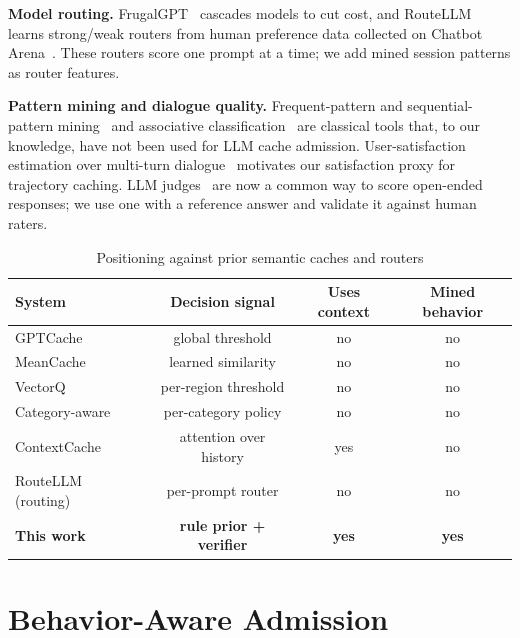 \documentclass[conference]{IEEEtran}
\begin{document}
\textbf{Model routing.} FrugalGPT~\cite{chen2024frugalgpt} cascades models to cut cost, and RouteLLM~\cite{ong2025routellm} learns strong/weak routers from human preference data collected on Chatbot Arena~\cite{chiang2024arena}. These routers score one prompt at a time; we add mined session patterns as router features.

\textbf{Pattern mining and dialogue quality.} Frequent-pattern and sequential-pattern mining~\cite{han2000fpgrowth,pei2001prefixspan} and associative classification~\cite{liu1998cba} are classical tools that, to our knowledge, have not been used for LLM cache admission. User-satisfaction estimation over multi-turn dialogue~\cite{bodigutla2020satisfaction} motivates our satisfaction proxy for trajectory caching. LLM judges~\cite{zheng2023judge} are now a common way to score open-ended responses; we use one with a reference answer and validate it against human raters.

\begin{table}[t]
\caption{Positioning against prior semantic caches and routers}
\label{tab:positioning}
\centering
\footnotesize
\begin{tabular}{@{}lccc@{}}
\toprule
System & Decision signal & Uses context & Mined behavior \\
\midrule
GPTCache~\cite{bang2023gptcache} & global threshold & no & no \\
MeanCache~\cite{gill2025meancache} & learned similarity & no & no \\
VectorQ~\cite{schroeder2025vectorq} & per-region threshold & no & no \\
Category-aware~\cite{wang2025category} & per-category policy & no & no \\
ContextCache~\cite{yan2025contextcache} & attention over history & yes & no \\
RouteLLM~\cite{ong2025routellm} (routing) & per-prompt router & no & no \\
\textbf{This work} & \textbf{rule prior + verifier} & \textbf{yes} & \textbf{yes} \\
\bottomrule
\end{tabular}
\end{table}

\section{Behavior-Aware Admission}
\label{sec:method}
\end{document}
